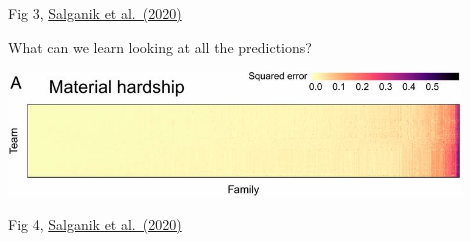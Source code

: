 \documentclass[aspectratio=169]{beamer}
\begin{document}
\begin{frame}

\begin{center}
\end{center}

\vfill
Fig 3, \href{https://doi.org/10.1073/pnas.1915006117}{Salganik et al.\ (2020)}

\end{frame}
\begin{frame}

\begin{center}
\Large{What can we learn looking at all the predictions?}
\end{center}

\end{frame}
\begin{frame}

\begin{center}
\includegraphics[width=0.90\textwidth]{figures/salganik_measuring_2020_fig4a}
\end{center}

\vfill
Fig 4, \href{https://doi.org/10.1073/pnas.1915006117}{Salganik et al.\ (2020)}
\end{frame}
\end{document}
